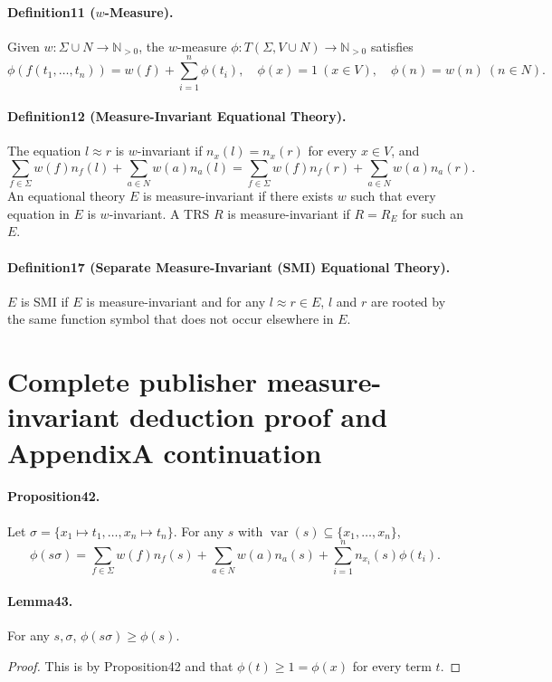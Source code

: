 \paragraph{Definition11 ($w$-Measure).} Given $w:\Sigma\cup N\to\mathbb N_{>0}$, the $w$-measure $\phi:T(\Sigma,V\cup N)\to\mathbb N_{>0}$ satisfies
\[
\phi(f(t_1,\ldots,t_n))=w(f)+\sum_{i=1}^n\phi(t_i),\quad \phi(x)=1\ (x\in V),\quad \phi(n)=w(n)\ (n\in N).
\]
\paragraph{Definition12 (Measure-Invariant Equational Theory).} The equation $l\approx r$ is $w$-invariant if $n_x(l)=n_x(r)$ for every $x\in V$, and
\[
\sum_{f\in\Sigma}w(f)n_f(l)+\sum_{a\in N}w(a)n_a(l)=\sum_{f\in\Sigma}w(f)n_f(r)+\sum_{a\in N}w(a)n_a(r).
\]
An equational theory $E$ is measure-invariant if there exists $w$ such that every equation in $E$ is $w$-invariant. A TRS $R$ is measure-invariant if $R=R_E$ for such an $E$.
\paragraph{Definition17 (Separate Measure-Invariant (SMI) Equational Theory).} $E$ is SMI if $E$ is measure-invariant and for any $l\approx r\in E$, $l$ and $r$ are rooted by the same function symbol that does not occur elsewhere in $E$.

\section*{Complete publisher measure-invariant deduction proof and AppendixA continuation}
\paragraph{Proposition42.} Let $\sigma=\{x_1\mapsto t_1,\ldots,x_n\mapsto t_n\}$. For any $s$ with $\operatorname{var}(s)\subseteq\{x_1,\ldots,x_n\}$,
\[
\phi(s\sigma)=\sum_{f\in\Sigma}w(f)n_f(s)+\sum_{a\in N}w(a)n_a(s)+\sum_{i=1}^nn_{x_i}(s)\phi(t_i).
\]
\paragraph{Lemma43.} For any $s,\sigma$, $\phi(s\sigma)\ge\phi(s)$.
\begin{proof}This is by Proposition42 and that $\phi(t)\ge1=\phi(x)$ for every term $t$.\end{proof}
